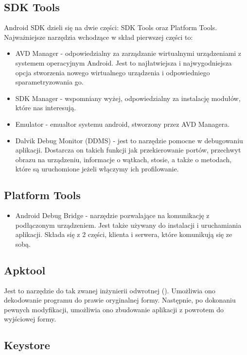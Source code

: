 \subsection{SDK Tools}

Android SDK dzieli się na dwie części: SDK Tools oraz Platform Tools. Najważniejsze narzędzia wchodzące w skład pierwszej części to:
\begin{itemize}
\item AVD Manager - odpowiedzialny za zarządzanie wirtualnymi urządzeniami z systemem operacyjnym Android. Jest to najłatwiejsza i najwygodniejsza opcja stworzenia nowego wirtualnego urządzenia i odpowiedniego sparametryzowania go.
\item SDK Manager - wspomniany wyżej, odpowiedzialny za instalację modułów, które nas interesują.
\item Emulator - emualtor systemu android, stworzony przez AVD Managera.
\item Dalvik Debug Monitor (DDMS) \label{ddms}- jest to narzędzie pomocne w debugowaniu aplikacji. Dostarcza on takich funkcji jak przekierowanie portów, przechwyt obrazu na urządzeniu, informacje o wątkach, stosie, a także o metodach, które są uruchomione jeżeli włączymy ich profilowanie.
\end{itemize}

\subsection{Platform Tools}

\begin{itemize}
\item Android Debug Bridge \label{adb}- narzędzie pozwalające na komunikację z podłączonym urządzeniem. Jest także używany do instalacji i uruchamiania aplikacji. Składa się z 2 części, klienta i serwera, które komunikują się ze sobą.
\end{itemize}

\subsection{Apktool}

Jest to narzędzie do tak zwanej inżynierii odwrotnej (). Umożliwia ono dekodowanie programu do prawie oryginalnej formy. Następnie, po dokonaniu pewnych modyfikacji, umożliwia ono zbudowanie aplikacji z powrotem do wyjściowej formy.\cite{doc:apktool}

\subsection{Keystore}

